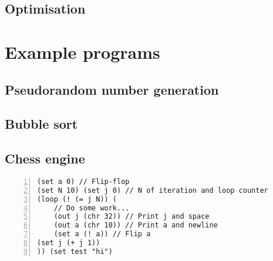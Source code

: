 \documentclass[aip,jcp,reprint]{revtex4-1}
\begin{document}
\subsection{Optimisation}

\section{Example programs}
\subsection{Pseudorandom number generation}
\subsection{Bubble sort}
\subsection{Chess engine}

\begin{lstlisting}[language=psll,frame=tb,numbers=left,aboveskip=3mm,belowskip=3mm]
(set a 0) // Flip-flop
(set N 10) (set j 0) // N of iteration and loop counter
(loop (! (= j N)) (
    // Do some work...
    (out j (chr 32)) // Print j and space
    (out a (chr 10)) // Print a and newline
    (set a (! a)) // Flip a
(set j (+ j 1))
)) (set test "hi")
\end{lstlisting}
\end{document}
